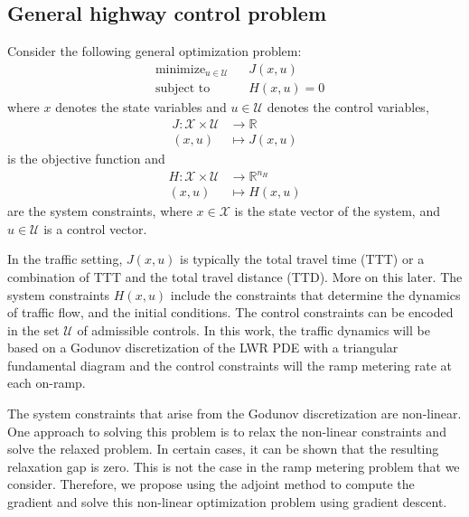 


\subsection{General highway control problem}

Consider the following general optimization problem:
\begin{equation}
\begin{aligned}
&\text{minimize}_{u \in \mathcal{U}} && J(x,u) \\
&\text{subject to} &&H(x,u) = 0
\end{aligned}
\end{equation}
where $x$ denotes the state variables and $u \in \mathcal{U}$ denotes the control variables,
\begin{equation}
\begin{aligned}
J: \mathcal{X} \times \mathcal{U} & \rightarrow \mathbb{R}\\
(x,u) & \mapsto J(x,u)
\end{aligned}
\end{equation}
is the objective function and 
\begin{equation}
\begin{aligned}
H: \mathcal{X} \times \mathcal{U} & \rightarrow \mathbb{R}^{n_H}\\
(x,u) & \mapsto H(x,u)
\end{aligned}
\end{equation}
are the system constraints, where $x \in \mathcal{X}$ is the state vector of the system, and $u \in \mathcal{U}$ is a control vector.

In the traffic setting, $J(x,u)$ is typically the total travel time (TTT) or a combination of TTT and the total travel distance (TTD). More on this later. The system constraints $H(x,u)$ include the constraints that determine the dynamics of traffic flow, and the initial conditions. The control constraints can be encoded in the set $\mathcal{U}$ of admissible controls. In this work, the traffic dynamics will be based on a Godunov discretization of the LWR PDE  with a triangular fundamental diagram and the control constraints will the ramp metering rate at each on-ramp. 

The system constraints that arise from the Godunov discretization are non-linear. One approach to solving this problem is to relax the non-linear constraints and solve the relaxed problem. In certain cases, it can be shown that the resulting relaxation gap is zero. This is not the case in the ramp metering problem that we consider. Therefore, we propose using the adjoint method to compute the gradient and solve this non-linear optimization problem using gradient descent.


